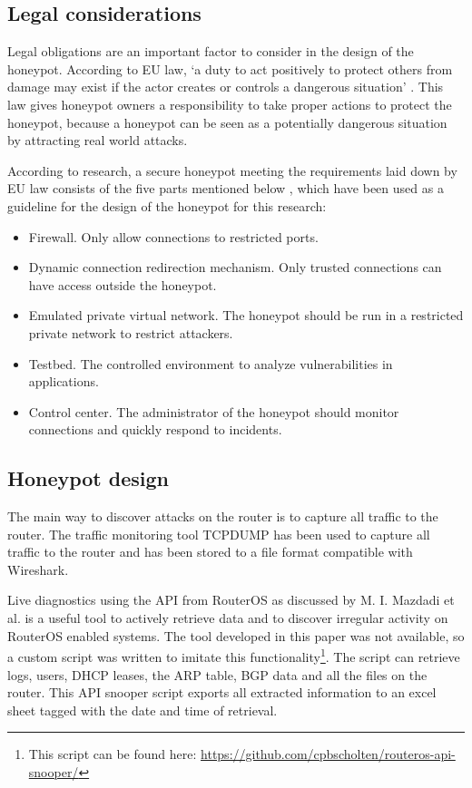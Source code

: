 \subsection{Legal considerations}
Legal obligations are an important factor to consider in the design of the honeypot. According to EU law, `a duty to act positively to protect others from damage may exist if the actor creates or controls a dangerous situation' \cite{EUTORTLAW:SPRINGER:2007}.
This law gives honeypot owners a responsibility to take proper actions to protect the honeypot, because a honeypot can be seen as a potentially dangerous situation by attracting real world attacks.

According to research, a secure honeypot meeting the requirements laid down by EU law consists of the five parts mentioned below \cite{HONEYPOTSLIABILITY:SPRINGER:2015}, which have been used as a guideline for the design of the honeypot for this research:
\begin{itemize}
    \setlength\itemsep{0em}
    \item Firewall. Only allow connections to restricted ports.
    \item Dynamic connection redirection mechanism. Only trusted connections can have access outside the honeypot.
    \item Emulated private virtual network. The honeypot should be run in a restricted private network to restrict attackers.
    \item Testbed. The controlled environment to analyze vulnerabilities in applications.
    \item Control center. The administrator of the honeypot should monitor connections and quickly respond to incidents.
\end{itemize}

\subsection{Honeypot design}
The main way to discover attacks on the router is to capture all traffic to the router. The traffic monitoring tool TCPDUMP has been used to capture all traffic to the router and has been stored to a file format compatible with Wireshark.

Live diagnostics using the API from RouterOS as discussed by M. I. Mazdadi et al. \cite{ROUTEROSFORENSICS:IJCSIS:2017} is a useful tool to actively retrieve data and to discover irregular activity on RouterOS enabled systems. The tool developed in this paper was not available, so a custom script was written to imitate this functionality\footnote{This script can be found here: \url{https://github.com/cpbscholten/routeros-api-snooper/}}. The script can retrieve logs, users, DHCP leases, the ARP table, BGP data and all the files on the router. This API snooper script exports all extracted information to an excel sheet tagged with the date and time of retrieval.

